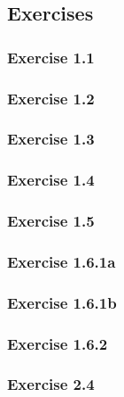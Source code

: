 \documentclass[10pt,a4paper]{article}
\begin{document}
\subsection{Exercises}
\subsubsection{Exercise 1.1}

\subsubsection{Exercise 1.2}

\subsubsection{Exercise 1.3}

\subsubsection{Exercise 1.4}

\subsubsection{Exercise 1.5}

\subsubsection{Exercise 1.6.1a}

\subsubsection{Exercise 1.6.1b}

\subsubsection{Exercise 1.6.2}

\subsubsection{Exercise 2.4}

\end{document}
